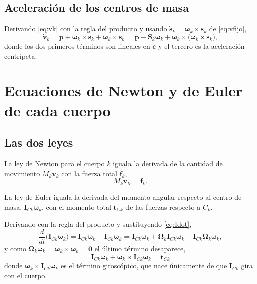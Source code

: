 \documentclass[11pt]{article}
\newcommand{\pvec}{\mathbf{p}}
\newcommand{\wv}{\boldsymbol{\omega}}
\newcommand{\cdd}{\ddot{\mathbf{c}}}
\newcommand{\IC}[1]{\mathbf{I}_{C#1}}
\newcommand{\Om}{\boldsymbol{\Omega}}
\begin{document}
\subsection{Aceleración de los centros de masa}

Derivando \eqref{eq:vk} con la regla del producto y usando $\dot{\mathbf{s}}_k=\wv_k\times\mathbf{s}_k$ de \eqref{eq:vfijo},
\begin{equation}
\dot{\mathbf{v}}_k
=\ddot{\pvec}+\dot{\wv}_k\times\mathbf{s}_k+\wv_k\times\dot{\mathbf{s}}_k
=\ddot{\pvec}-\mathbf{S}_k\dot{\wv}_k+\wv_k\times\big(\wv_k\times\mathbf{s}_k\big),
\label{eq:ak}
\end{equation}
donde los dos primeros términos son lineales en $\cdd$ y el tercero es la aceleración centrípeta.

\section{Ecuaciones de Newton y de Euler de cada cuerpo}

\subsection{Las dos leyes}

La ley de Newton para el cuerpo $k$ iguala la derivada de la cantidad de movimiento $M_k\mathbf{v}_k$ con la fuerza total $\mathbf{f}_k$,
\begin{equation}
M_k\dot{\mathbf{v}}_k=\mathbf{f}_k .
\label{eq:newtonk}
\end{equation}

La ley de Euler iguala la derivada del momento angular respecto al centro de masa, $\IC{k}\wv_k$, con el momento total $\mathbf{t}_{Ck}$ de las fuerzas respecto a $C_k$.

Derivando con la regla del producto y sustituyendo \eqref{eq:Idot},
\begin{equation}
\frac{d}{dt}\big(\IC{k}\wv_k\big)
=\IC{k}\dot{\wv}_k+\dot{\mathbf{I}}_{Ck}\wv_k
=\IC{k}\dot{\wv}_k+\Om_k\IC{k}\wv_k-\IC{k}\Om_k\wv_k ,
\label{eq:Ldot}
\end{equation}
y como $\Om_k\wv_k=\wv_k\times\wv_k=\mathbf{0}$ el último término desaparece,
\begin{equation}
\boxed{\ \IC{k}\dot{\wv}_k+\wv_k\times\IC{k}\wv_k=\mathbf{t}_{Ck}\ }
\label{eq:eulerk}
\end{equation}
donde $\wv_k\times\IC{k}\wv_k$ es el término giroscópico, que nace únicamente de que $\IC{k}$ gira con el cuerpo.
\end{document}
